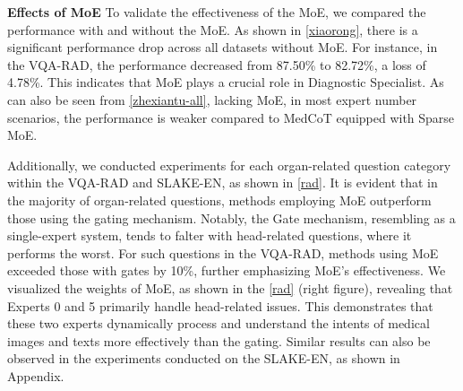 \documentclass[11pt]{article}
\begin{document}
\noindent\textbf{Effects of MoE}
To validate the effectiveness of the MoE, we compared the performance with and without the MoE. As shown in \autoref{xiaorong}, there is a significant performance drop across all datasets without MoE. For instance, in the VQA-RAD, the performance decreased from 87.50\% to 82.72\%, a loss of 4.78\%. This indicates that MoE plays a crucial role in Diagnostic Specialist.
As can also be seen from \autoref{zhexiantu-all}, lacking MoE, in most expert number scenarios, the performance is weaker compared to MedCoT equipped with Sparse MoE.

Additionally, we conducted experiments for each organ-related question category within the VQA-RAD and SLAKE-EN, as shown in \autoref{rad}. 
It is evident that in the majority of organ-related questions, methods employing MoE outperform those using the gating mechanism. 
Notably, the Gate mechanism, resembling as a single-expert system, tends to falter with head-related questions, where it performs the worst. For such questions in the VQA-RAD, methods using MoE exceeded those with gates by 10\%, further emphasizing MoE's effectiveness.
We visualized the weights of MoE, as shown in the \autoref{rad} (right figure), revealing that Experts 0 and 5 primarily handle head-related issues. This demonstrates that these two experts dynamically process and understand the intents of medical images and texts more effectively than the gating. 
Similar results can also be observed in the experiments conducted on the SLAKE-EN, as shown in Appendix.
\end{document}
